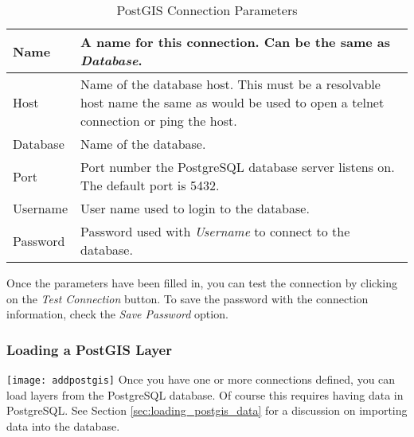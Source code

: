 \begin{table}[h]
\centering
\caption{PostGIS Connection
Parameters}\label{tab:postgis_connection_parms}\medskip
 \begin{tabular}{|l|p{5in}|}
\hline Name & A name for this connection. Can be the same as \textsl{Database}.
\\
\hline Host \index{PostgreSQL!host}
& Name of the database host. This must be a resolvable host name the same as
would be used to open a telnet connection or ping the host. \\
\hline Database \index{PostgreSQL!database} & Name of the database.  \\
\hline Port \index{PostgreSQL!port}& Port number the PostgreSQL database
server listens on. The default port is 5432.\\
\hline Username \index{PostgreSQL!username}& User name used to login to the
database. \\
\hline Password \index{PostgreSQL!password}& Password used with
\textsl{Username} to connect to the database.\\
\hline
\end{tabular}
\end{table}

Once the parameters have been filled in, you can test the connection by
clicking on the \textsl{Test
Connection} button. To save the password
with the connection information, check the \textsl{Save Password} option.

\begin{Tip}\caption{\textsc{QGIS User Settings and
Security}}
\end{Tip}

\subsubsection{Loading a PostGIS Layer}

\texttt{[image: addpostgis]} Once you have one or more
connections defined, you can load layers from the PostgreSQL database. Of
course this requires having data in PostgreSQL. See Section
\ref{sec:loading_postgis_data} for a discussion on importing data into the
database. 

